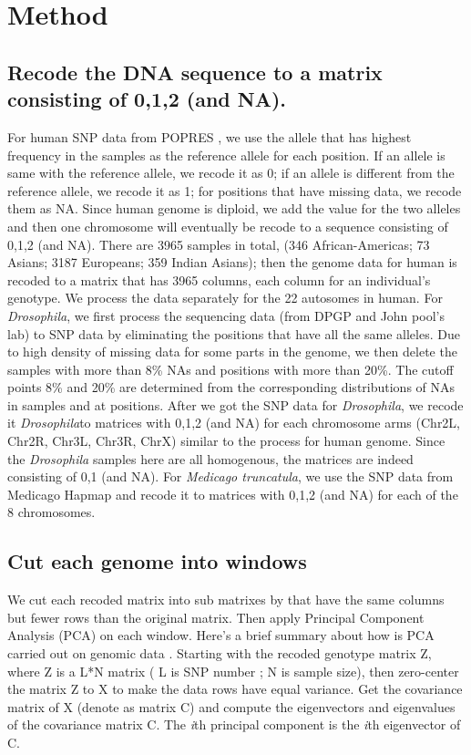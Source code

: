 \documentclass[11pt, oneside]{article}   	%
\begin{document}
\section{Method}
\subsection{Recode the DNA sequence to a matrix consisting of 0,1,2 (and NA).}
For human SNP data from POPRES \cite{key8}, we use the allele that has highest frequency in the samples as the reference allele for each position. If an allele is same with the reference allele, we recode it as 0; if an allele is different from the reference allele, we recode it as 1; for positions that have missing data, we recode them as NA. Since human genome is diploid, we add the value for the two alleles and then one chromosome will eventually be recode to a sequence consisting of 0,1,2 (and NA). There are 3965 samples in total, (346 African-Americas; 73 Asians; 3187 Europeans; 359 Indian Asians); then the genome data for human is recoded to a matrix that has 3965 columns, each column for an individual's genotype. We process the data separately for the 22 autosomes in human. For \textit{Drosophila}, we first process the sequencing data (from DPGP and John pool's lab) to SNP data by eliminating the positions that have all the same alleles. Due to high density of missing data for some parts in the genome, we then delete the samples with more than 8\% NAs and positions with more than 20\%. The cutoff points 8\% and 20\% are determined from the corresponding distributions of NAs in samples and at positions. After we got the SNP data for \textit{Drosophila}, we recode it \textit{Drosophila}to matrices with 0,1,2 (and NA) for each chromosome arms (Chr2L, Chr2R, Chr3L, Chr3R, ChrX) similar to the process for human genome. Since the \textit{Drosophila} samples here are all homogenous, the matrices are indeed consisting of 0,1 (and NA). For \textit{Medicago truncatula}, we use the SNP data from Medicago Hapmap and recode it to matrices with 0,1,2 (and NA) for each of the 8 chromosomes.

\subsection{Cut each genome into windows}
We cut each recoded matrix into sub matrixes by that have the same columns but fewer rows than the original matrix. Then apply Principal Component Analysis (PCA) on each window. Here's a brief summary about how is PCA carried out on genomic data \cite{mcvean2009genealogical}. Starting with the recoded genotype matrix Z, where Z is a L*N matrix ( L is SNP number ; N is sample size), then zero-center the matrix Z to X to make the data rows have equal variance. Get the covariance matrix of X (denote as matrix C) and compute the eigenvectors and eigenvalues of the covariance matrix C. The \textit{i}th principal component is the \textit{i}th eigenvector of C.
\end{document}
